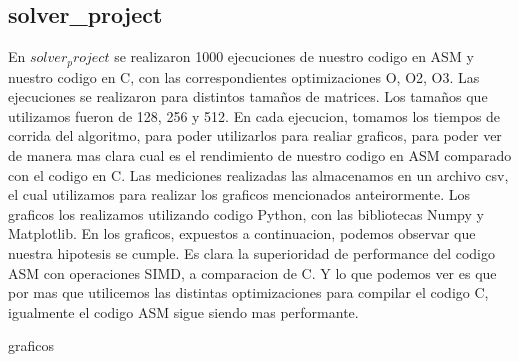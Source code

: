 \pagebreak

\subsection{solver\_project}

En $solver_project$ se realizaron 1000 ejecuciones de nuestro codigo en ASM y nuestro codigo en C, con las correspondientes optimizaciones O, O2, O3. Las ejecuciones se realizaron para distintos tamaños de matrices.
Los tamaños que utilizamos fueron de 128, 256 y 512.
En cada ejecucion, tomamos los tiempos de corrida del algoritmo, para poder utilizarlos para realiar graficos, para poder ver de manera mas clara cual es el rendimiento de nuestro codigo en ASM comparado con el codigo en C.
Las mediciones realizadas las almacenamos en un archivo csv, el cual utilizamos para realizar los graficos mencionados anteirormente.
Los graficos los realizamos utilizando codigo Python, con las bibliotecas Numpy y Matplotlib.
En los graficos, expuestos a continuacion, podemos observar que nuestra hipotesis se cumple.
Es clara la superioridad de performance del codigo ASM con operaciones SIMD, a comparacion de C.
Y lo que podemos ver es que por mas que utilicemos las distintas optimizaciones para compilar el codigo C, igualmente el codigo ASM sigue siendo mas performante.

graficos

